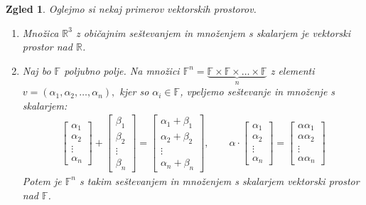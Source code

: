 \documentclass[10pt, a4paper]{article}
\newtheorem{zgled}{Zgled}[section]
\newcommand{\R}{\mathbb {R}}
\newcommand{\F}{\mathbb {F}}
\begin{document}
\begin{zgled}
    Oglejmo si nekaj primerov vektorskih prostorov.
\begin{enumerate}
    \item Množica $\R^3$ z običajnim seštevanjem in množenjem s skalarjem je vektorski prostor nad $\R$.
    \item Naj bo $\F$ poljubno polje. Na množici
    $\F^n = \underbrace{\F \times \F \times \dots \times \F}_n$ z elementi
    $v =(\alpha_1, \alpha_2, \dots , \alpha_n),$ kjer so $\alpha_i \in \F$,
    vpeljemo seštevanje in množenje s skalarjem:
    \begin{gather*}
        \begin{bmatrix}
            \alpha_1\\ \alpha_2\\ \vdots \\ \alpha_n
        \end{bmatrix} + \begin{bmatrix}
            \beta_1\\ \beta_2\\ \vdots \\ \beta_n
        \end{bmatrix} = \begin{bmatrix}
            \alpha_1 + \beta_1\\ \alpha_2 + \beta_2\\ \vdots \\ \alpha_n + \beta_n
        \end{bmatrix},\qquad
        \alpha \cdot \begin{bmatrix}
            \alpha_1\\ \alpha_2\\ \vdots \\ \alpha_n
        \end{bmatrix} = \begin{bmatrix}
            \alpha \alpha_1\\ \alpha \alpha_2\\ \vdots \\ \alpha \alpha_n
        \end{bmatrix}
    \end{gather*}
    Potem je $\F^n$ s takim seštevanjem in množenjem s skalarjem vektorski prostor nad $\F$.
\end{enumerate}
\end{zgled}    
\end{document}

